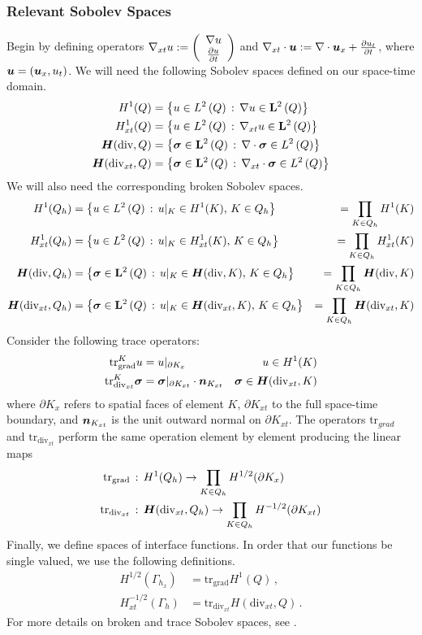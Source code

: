 \documentclass{article}
\begin{document}
\subsubsection{Relevant Sobolev Spaces}
Begin by defining operators $\nabla_{xt} u:=\left( \begin{array}{c} \nabla u\\ \frac{\partial u}{\partial t}\\ \end{array} \right)$ and $\nabla_{xt}\cdot\boldsymbol u:=\nabla\cdot\boldsymbol u_x+\frac{\partial u_t}{\partial t}$, where $\boldsymbol u=(\boldsymbol u_x,u_t)$.
We will need the following Sobolev spaces defined on our space-time domain.
\begin{align*}
H^{1}(Q)&=\left\{ u\in L^2\left( Q \right)\,:\,\nabla u\in\mathbf{L}^2\left( Q \right) \right\}\\
H^1_{xt}(Q)&=\left\{ u\in L^2\left( Q \right)\,:\,\nabla_{xt} u\in\mathbf{L}^2\left( Q \right) \right\}\\
\mbox{\boldmath $H$}(\text{div},Q)&=\left\{ \boldsymbol\sigma\in\mathbf{L}^2\left( Q \right)\,:\,\nabla\cdot\boldsymbol\sigma\in L^2\left( Q \right) \right\}\\
\mbox{\boldmath $H$}(\text{div}_{xt},Q)&=\left\{ \boldsymbol\sigma\in\mathbf{L}^2\left( Q \right)\,:\,\nabla_{xt}\cdot\boldsymbol\sigma\in L^2\left( Q \right) \right\}\\
\end{align*}
We will also need the corresponding broken Sobolev spaces.
\begin{align*}
H^1(Q_h)&=\left\{ u\in L^2\left( Q \right)\,:\,u|_K\in H^{1}(K),\,K\in Q_h \right\}&=\prod_{K\in Q_h}H^1(K)\\
H^1_{xt}(Q_h)&=\left\{ u\in L^2\left( Q \right)\,:\,u|_K\in H^1_{xt}(K),\,K\in Q_h \right\}&=\prod_{K\in Q_h}H^1_{xt}(K)\\
\mbox{\boldmath $H$}(\text{div},Q_h)&=\left\{ \boldsymbol\sigma\in\mathbf{L}^2\left( Q \right)\,:\,u|_K\in\mbox{\boldmath $H$}(\text{div},K),\,K\in Q_h \right\}&=\prod_{K\in Q_h}\mbox{\boldmath $H$}(\text{div},K)\\
\mbox{\boldmath $H$}(\text{div}_{xt},Q_h)&=\left\{ \boldsymbol\sigma\in\mathbf{L}^2\left( Q \right)\,:\,u|_K\in\mbox{\boldmath $H$}(\text{div}_{xt},K),\,K\in Q_h \right\}&=\prod_{K\in Q_h}\mbox{\boldmath $H$}(\text{div}_{xt},K)
\end{align*}
Consider the following trace operators:
\begin{align*}
\text{tr}^K_\text{grad} u&=u|_{\partial K_x} & u\in H^1(K)\\
\text{tr}^K_{\text{div}_{xt}} \boldsymbol\sigma&=\boldsymbol\sigma|_{\partial K_{xt}}\cdot\boldsymbol n_{K_{xt}} & \boldsymbol\sigma\in \mbox{\boldmath $H$}(\text{div}_{xt},K)
\end{align*}
where $\partial K_x$ refers to spatial faces of element $K$, $\partial K_{xt}$ to the full space-time boundary, and $\boldsymbol n_{K_{xt}}$ is the unit outward normal on $\partial K_{xt}$.
The operators $\text{tr}_{grad}$ and $\text{tr}_{\text{div}_{xt}}$ perform the same operation element by element producing the linear maps
\begin{align*}
\text{tr}_{\text{grad}}&\,:\,H^1(Q_h)\rightarrow\prod_{K\in Q_h}H^{1/2}(\partial K_x)\\
\text{tr}_{\text{div}_{xt}}&\,:\,\mbox{\boldmath $H$}(\text{div}_{xt},Q_h)\rightarrow\prod_{K\in Q_h}H^{-1/2}(\partial K_{xt})
\end{align*}
Finally, we define spaces of interface functions.
In order that our functions be single valued, we use the following definitions.
\begin{align*}
H^{1/2}(\Gamma_{h_x})&=\text{tr}_{\text{grad}}H^{1}(Q)\,,\\
H^{-1/2}_{xt}(\Gamma_h)&=\text{tr}_{\text{div}_{xt}}H(\text{div}_{xt},Q)\,.
\end{align*}
For more details on broken and trace Sobolev spaces, see \cite{BreakingSpaces}.
\end{document}

